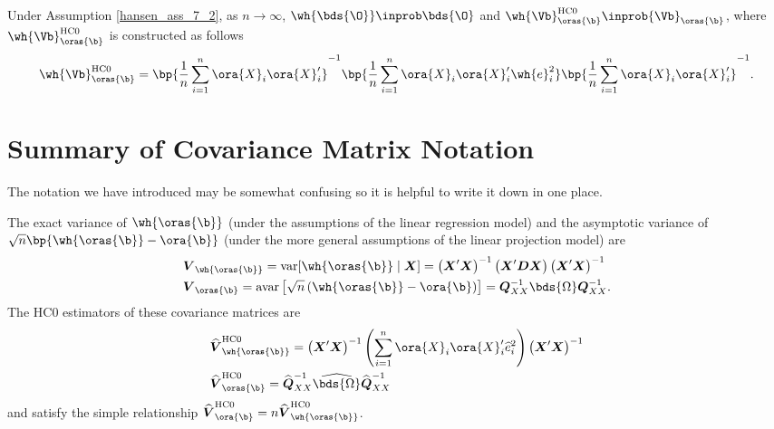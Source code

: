 \begin{theorem}
    \label{hansen_thm_7_6}
    Under Assumption \ref{hansen_ass_7_2}, as $n \rightarrow \infty$, $\wh{\bds{\O}} \inprob \bds{\O}$ and $\wh{\Vb}_{\oras{\b}}^{\text{HC0}} \inprob {\Vb}_{\oras{\b}}$, where $\wh{\Vb}_{\oras{\b}}^{\text{HC0}}$ is constructed as follows
    \begin{equation}
        \notag 
        \wh{\Vb}_{\oras{\b}}^{\text{HC0}} = \bp{\frac{1}{n} \sum_{i=1}^{n} \ora{X}_i \ora{X}_i^{\prime}}^{-1} \bp{\frac{1}{n} \sum_{i=1}^{n} \ora{X}_i \ora{X}_i^{\prime}\wh{e}_i^2} \bp{\frac{1}{n} \sum_{i=1}^{n} \ora{X}_i \ora{X}_i^{\prime}}^{-1}.
    \end{equation}
\end{theorem}

\section{Summary of Covariance Matrix Notation}

The notation we have introduced may be somewhat confusing so it is helpful to write it down in one place.

The exact variance of $\wh{\oras{\b}}$ (under the assumptions of the linear regression model) and the asymptotic variance of $\sqrt{n}\bp{\wh{\oras{\b}} - \ora{\b}}$ (under the more general assumptions of the linear projection model) are 
\begin{equation}
    \notag
    \begin{aligned}
        & \boldsymbol{V}_{\wh{\oras{\b}}}=\operatorname{var}[\wh{\oras{\b}} \mid \boldsymbol{X}]=\left(\boldsymbol{X}^{\prime} \boldsymbol{X}\right)^{-1}\left(\boldsymbol{X}^{\prime} \boldsymbol{D} \boldsymbol{X}\right)\left(\boldsymbol{X}^{\prime} \boldsymbol{X}\right)^{-1} \\
        & \boldsymbol{V}_{\oras{\b}}=\operatorname{avar}\left[\sqrt{n}\left(\wh{\oras{\b}}-\ora{\b}\right)\right]=\boldsymbol{Q}_{X X}^{-1} \bds{\Omega} \boldsymbol{Q}_{X X}^{-1} .
    \end{aligned}
\end{equation}
The HC0 estimators of these covariance matrices are 
\begin{equation}
    \notag
    \begin{aligned}
        & \widehat{\boldsymbol{V}}_{\wh{\oras{\b}}}^{\mathrm{HC} 0}=\left(\boldsymbol{X}^{\prime} \boldsymbol{X}\right)^{-1}\left(\sum_{i=1}^n \ora{X}_i \ora{X}_i^{\prime} \widehat{e}_i^2\right)\left(\boldsymbol{X}^{\prime} \boldsymbol{X}\right)^{-1} \\
        & \widehat{\boldsymbol{V}}_{{\oras{\b}}}^{\mathrm{HC} 0}=\widehat{\boldsymbol{Q}}_{X X}^{-1} \widehat{\bds{\Omega}} \widehat{\boldsymbol{Q}}_{X X}^{-1}
    \end{aligned}
\end{equation}
and satisfy the simple relationship $\widehat{\boldsymbol{V}}_{{\ora{\b}}}^{\mathrm{HC} 0} = n \widehat{\boldsymbol{V}}_{\wh{\oras{\b}}}^{\mathrm{HC} 0}$.

